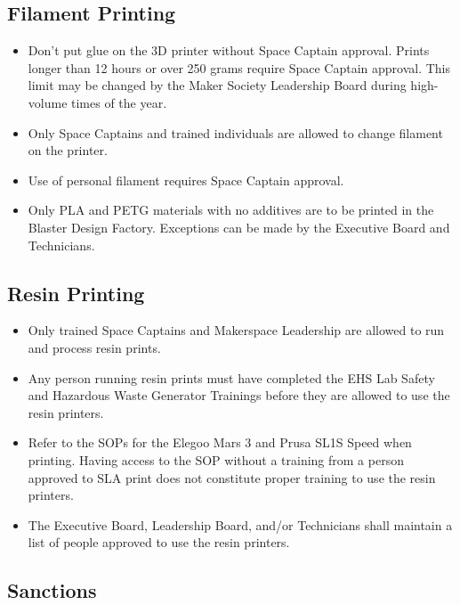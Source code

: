 \documentclass[12pt,letterpaper]{article}
\newcommand{\badd}[1]{
    {\color{darkgreen}#1}
}
\begin{document}
\badd{
\subsection{Filament Printing}

\begin{itemize}
    \item Don’t put glue on the 3D printer without Space Captain approval. 
    Prints longer than 12 hours or over 250 grams require Space Captain approval. This limit may be changed by the Maker Society Leadership Board during high-volume times of the year.
    \item Only Space Captains and trained individuals are allowed to change filament on the printer. 
    \item Use of personal filament requires Space Captain approval.
    \item Only PLA and PETG materials with no additives are to be printed in the Blaster Design Factory. Exceptions can be made by the Executive Board and Technicians. %
\end{itemize}

\subsection{Resin Printing}

\begin{itemize}
    \item Only trained Space Captains and Makerspace Leadership are allowed to run and process resin prints.
    \item Any person running resin prints must have completed the EHS Lab Safety and Hazardous Waste Generator Trainings before they are allowed to use the resin printers.
    \item Refer to the SOPs for the Elegoo Mars 3 and Prusa SL1S Speed when printing. Having access to the SOP without a training from a person approved to SLA print does not constitute proper training to use the resin printers.
    \item The Executive Board, Leadership Board, and/or Technicians shall maintain a list of people approved to use the resin printers.
\end{itemize}

}

\subsection{Sanctions}
\end{document}
